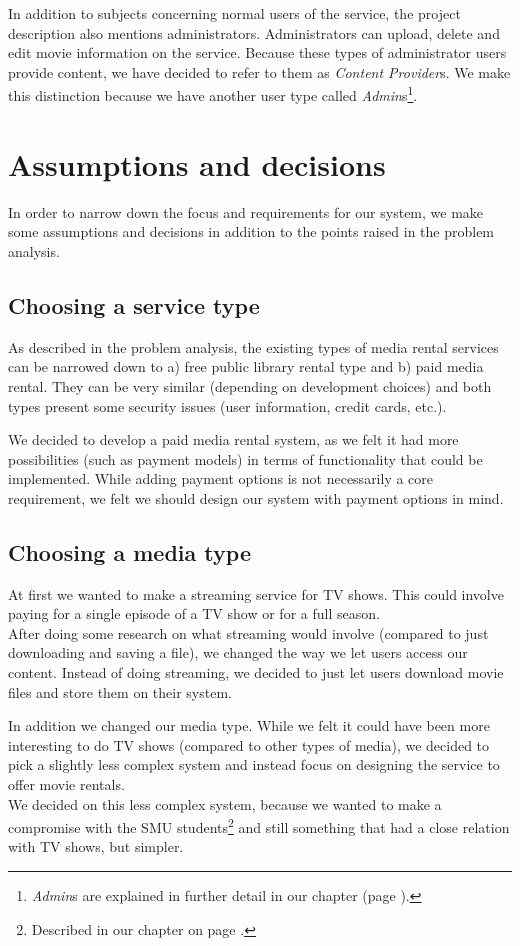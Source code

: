 In addition to subjects concerning normal users of the service, the project description also mentions administrators. Administrators can upload, delete and edit movie information on the service. Because these types of administrator users provide content, we have decided to refer to them as \textit{Content Provider}s. We make this distinction because we have another user type called \textit{Admin}s\footnote{\textit{Admin}s are explained in further detail in our  chapter (page \pageref{Design}).}.
\section{Assumptions and decisions}
\label{Overview_assumptions}
In order to narrow down the focus and requirements for our system, we make some assumptions and decisions in addition to the points raised in the problem analysis. 
\subsection{Choosing a service type}
\label{Overview_assumptions_stype}
As described in the problem analysis, the existing types of media rental services can be narrowed down to a) free public library rental type and b) paid media rental. They can be very similar (depending on development choices) and both types present some security issues (user information, credit cards, etc.).

We decided to develop a paid media rental system, as we felt it had more possibilities (such as payment models) in terms of functionality that could be implemented. While adding payment options is not necessarily a core requirement, we felt we should design our system with payment options in mind.
\subsection{Choosing a media type}
\label{Overview_assumptions_mtype}
At first we wanted to make a streaming service for TV shows. This could involve paying for a single episode of a TV show or for a full season. \\After doing some research on what streaming would involve (compared to just downloading and saving a file), we changed the way we let users access our content. Instead of doing streaming, we decided to just let users download movie files and store them on their system.

In addition we changed our media type. While we felt it could have been more interesting to do TV shows (compared to other types of media), we decided to pick a slightly less complex system and instead focus on designing the service to offer movie rentals. \\ We decided on this less complex system, because we wanted to make a compromise with the SMU students\footnote{Described in our  chapter on page \pageref{Collaboration}.} and still something that had a close relation with TV shows, but simpler.
